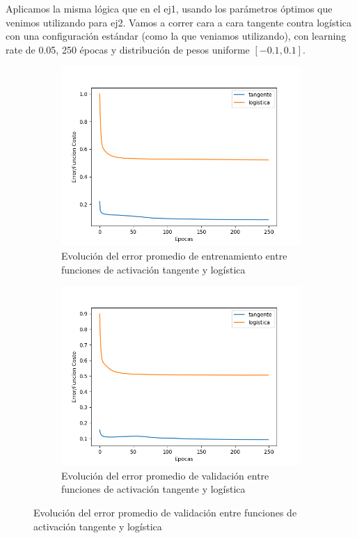 Aplicamos la misma lógica que en el ej1, usando los parámetros óptimos que venimos utilizando para ej2.
Vamos a correr cara a cara tangente contra logística con una configuración estándar (como la que veniamos utilizando), con 
learning rate de 0.05, 250 épocas y distribución de pesos uniforme $[-0.1, 0.1]$.

\begin{figure}[!htbp]
\centering
\begin{subfigure}{.5\textwidth}
  \centering
  \includegraphics[width=1\linewidth]{graficos/ej2/factivaciones_promedios_entrenamiento_normal.png}
  \caption{Evolución del error promedio de entrenamiento entre funciones de activación tangente y logística}
  \label{fig:sub1}
\end{subfigure}%
\begin{subfigure}{.5\textwidth}
  \centering
  \includegraphics[width=1\linewidth]{graficos/ej2/factivaciones_promedios_validacion_normal.png}
  \caption{Evolución del error promedio de validación entre funciones de activación tangente y logística}
  \label{fig:sub2}
\end{subfigure}
\end{figure}

